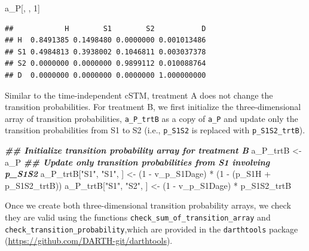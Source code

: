 \documentclass[
]{article}
\newenvironment{Shaded}{\begin{snugshade}}{\end{snugshade}}
\newcommand{\DecValTok}[1]{\textcolor[rgb]{0.00,0.00,0.81}{#1}}
\newcommand{\DocumentationTok}[1]{\textcolor[rgb]{0.56,0.35,0.01}{\textbf{\textit{#1}}}}
\newcommand{\NormalTok}[1]{#1}
\newcommand{\OtherTok}[1]{\textcolor[rgb]{0.56,0.35,0.01}{#1}}
\newcommand{\SpecialCharTok}[1]{\textcolor[rgb]{0.00,0.00,0.00}{#1}}
\newcommand{\StringTok}[1]{\textcolor[rgb]{0.31,0.60,0.02}{#1}}
\begin{document}
\begin{Shaded}
\begin{Highlighting}[]
\NormalTok{a\_P[, , }\DecValTok{1}\NormalTok{]}
\end{Highlighting}
\end{Shaded}

\begin{verbatim}
##            H        S1        S2           D
## H  0.8491385 0.1498480 0.0000000 0.001013486
## S1 0.4984813 0.3938002 0.1046811 0.003037378
## S2 0.0000000 0.0000000 0.9899112 0.010088764
## D  0.0000000 0.0000000 0.0000000 1.000000000
\end{verbatim}

Similar to the time-independent cSTM, treatment A does not change the transition probabilities. For treatment B, we first initialize the three-dimensional array of transition probabilities, \texttt{a\_P\_trtB} as a copy of \texttt{a\_P} and update only the transition probabilities from S1 to S2 (i.e., \texttt{p\_S1S2} is replaced with \texttt{p\_S1S2\_trtB}).

\begin{Shaded}
\begin{Highlighting}[]
\DocumentationTok{\#\# Initialize transition probability array for treatment B}
\NormalTok{a\_P\_trtB }\OtherTok{\textless{}{-}}\NormalTok{ a\_P}
\DocumentationTok{\#\# Update only transition probabilities from S1 involving p\_S1S2}
\NormalTok{a\_P\_trtB[}\StringTok{"S1"}\NormalTok{, }\StringTok{"S1"}\NormalTok{, ] }\OtherTok{\textless{}{-}}\NormalTok{ (}\DecValTok{1} \SpecialCharTok{{-}}\NormalTok{ v\_p\_S1Dage) }\SpecialCharTok{*}\NormalTok{ (}\DecValTok{1} \SpecialCharTok{{-}}\NormalTok{ (p\_S1H }\SpecialCharTok{+}\NormalTok{ p\_S1S2\_trtB))}
\NormalTok{a\_P\_trtB[}\StringTok{"S1"}\NormalTok{, }\StringTok{"S2"}\NormalTok{, ] }\OtherTok{\textless{}{-}}\NormalTok{ (}\DecValTok{1} \SpecialCharTok{{-}}\NormalTok{ v\_p\_S1Dage) }\SpecialCharTok{*}\NormalTok{ p\_S1S2\_trtB}
\end{Highlighting}
\end{Shaded}

Once we create both three-dimensional transition probability arrays, we check they are valid using the functions \texttt{check\_sum\_of\_transition\_array} and \texttt{check\_transition\_probability},which are provided in the \texttt{darthtools} package (\url{https://github.com/DARTH-git/darthtools}).
\end{document}
